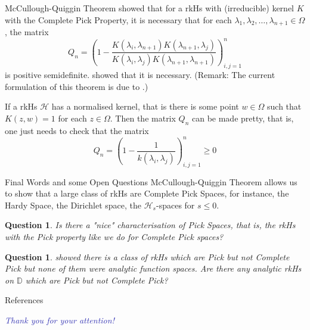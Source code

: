 \documentclass[handout]{beamer}
\newtheorem{question}[theorem]{Question}
\newcommand{\D}{\mathbb D}
\newcommand{\calH}{{\mathcal H}}
\begin{document}
\begin{frame}{McCullough-Quiggin Theorem}
\citeauthor{zbMATH00222166} \cite{zbMATH00222166} showed that for a rkHs with (irreducible) kernel $K$ with the Complete Pick Property, it is necessary that for each $\lambda_{1}, \lambda_{2}, \ldots, \lambda_{n+1}\in \Omega$, the matrix
\begin{equation*}
Q_{n} = \left( 1-\frac{K\left( \lambda_{i}, \lambda_{n+1} \right)K\left( \lambda_{n+1}, \lambda_{j} \right)}{K\left( \lambda_{i}, \lambda_{j} \right) K\left( \lambda_{n+1}, \lambda_{n+1} \right)} \right)_{i,j=1}^{n}
\end{equation*}
is positive semidefinite. \citeauthor{MR1284929} \cite{MR1284929} showed that it is necessary. (Remark: The current formulation of this theorem is due to \citeauthor{MR1774853} \cite{MR1774853}.) 

If a rkHs $\calH$ has a normalised kernel, that is there is some point $w \in \Omega$ such that $K \left( z,w \right) = 1$ for each $z \in \Omega$. Then the matrix $Q_{n}$ can be made pretty, that is, one just needs to check that the matrix
\begin{equation*}
Q_{n} = \left( 1-\frac{1}{k\left( \lambda_{i}, \lambda_{j} \right)} \right)_{i,j=1}^{n} \ge 0
\end{equation*}
\end{frame}

\begin{frame}{Final Words and some Open Questions}
McCullough-Quiggin Theorem allows us to show that a large class of rkHs are Complete Pick Spaces, for instance, the Hardy Space, the Dirichlet space, the $\calH _{s}$-spaces for $s\le 0$. \pause
\begin{question}
Is there a "nice" characterisation of Pick Spaces, that is, the rkHs with the Pick property like we do for Complete Pick spaces?
\end{question}
\pause
\begin{question}
\citeauthor{MR2187439} \cite{MR2187439} showed there is a class of rkHs which are Pick but not Complete Pick but none of them were analytic function spaces. Are there any analytic rkHs on $\D$ which are Pick but not Complete Pick?
\end{question}
\end{frame}

\begin{frame}[allowframebreaks]{References}
\nocite{*}
\printbibliography
\end{frame}
\begin{frame}
  \centering \Large
  \textcolor[HTML]{3333B3}{\emph{Thank you for your attention!}}
\end{frame}
\end{document}
